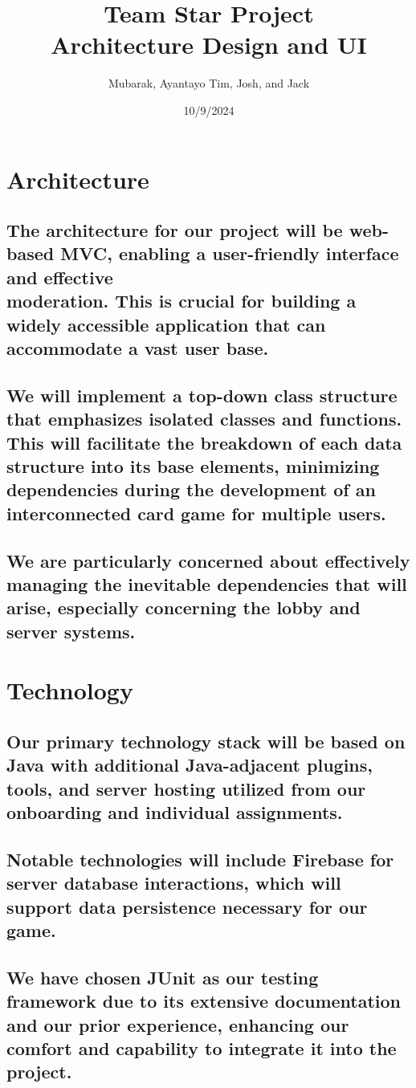 \documentclass{article}
\title{Team Star Project \\ \large Architecture Design and UI}
\author{Mubarak, Ayantayo Tim, Josh, and Jack}
\date{10/9/2024}
\begin{document}
\maketitle


\section{Architecture}
\subsection{The architecture for our project will be web-based MVC, enabling a user-friendly interface and effective \\ moderation. This is crucial for building a widely accessible application that can accommodate a vast user base.}
\subsection{We will implement a top-down class structure that emphasizes isolated classes and functions. This will facilitate the breakdown of each data structure into its base elements, minimizing dependencies during the development of an interconnected card game for multiple users.}
\subsection{We are particularly concerned about effectively managing the inevitable dependencies that will arise, especially concerning the lobby and server systems.}


\section{Technology}
\subsection{Our primary technology stack will be based on Java with additional Java-adjacent plugins, tools, and server hosting utilized from our onboarding and individual assignments.}
\subsection{Notable technologies will include Firebase for server database interactions, which will support data persistence necessary for our game.}
\subsection{We have chosen JUnit as our testing framework due to its extensive documentation and our prior experience, enhancing our comfort and capability to integrate it into the project.}
\end{document}
